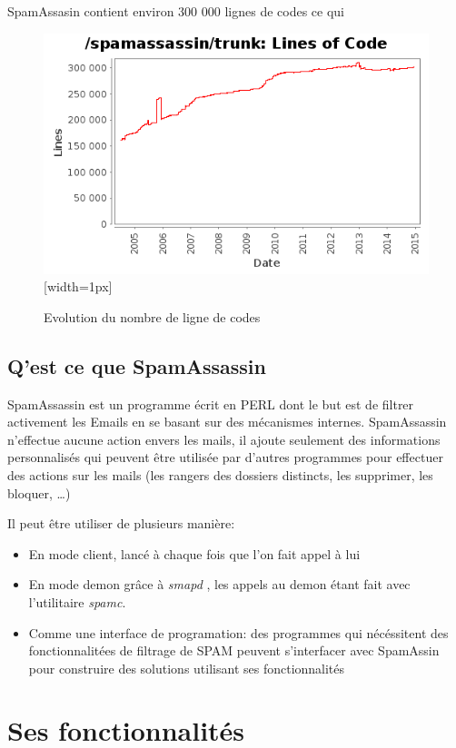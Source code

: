 \documentclass[a4paper,11pt]{article}
\begin{document}
SpamAssasin contient environ 300 000 lignes de codes ce qui 

\begin{figure}
 \centering
 \includegraphics{annexes/lignes.png}[width=1px]
 \caption{Evolution du nombre de ligne de codes}
\end{figure}


\subsection{Q'est ce que SpamAssassin}

SpamAssassin est un programme écrit en PERL dont le but est de filtrer activement les Emails en se basant sur des mécanismes internes. 
SpamAssassin n'effectue aucune action envers les mails, il ajoute seulement des informations personnalisés
qui peuvent être utilisée par d'autres programmes pour effectuer des actions sur les mails (les rangers des dossiers distincts, les supprimer, les bloquer, \dots)


Il peut être utiliser de plusieurs manière:
\begin{itemize}
 \item En mode client, lancé à chaque fois que l'on fait appel à lui
 \item En mode demon grâce à \emph{smapd} , les appels au demon étant fait avec l'utilitaire \emph{spamc}.
 \item Comme une interface de programation: des programmes qui nécéssitent des fonctionnalitées de filtrage de SPAM peuvent s'interfacer avec SpamAssin
 pour construire des solutions utilisant ses fonctionnalités
\end{itemize}

\pagebreak

\section{Ses fonctionnalités}
\end{document}
